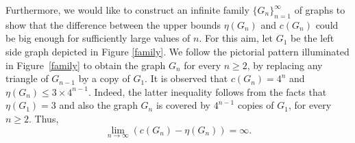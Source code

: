 \documentclass[12pt]{amsart}
\let\to=\rightarrow
\begin{document}
\par Furthermore, we would like to construct an infinite family $\{G_n\}_{n=1}^{\infty}$ of graphs to show that the difference between the upper bounds $\eta(G_n)$ and $c(G_n)$ could be big enough for sufficiently large values of $n$. For this aim, let $G_1$ be the left side graph depicted in Figure \ref{family}. We follow the pictorial pattern illuminated in Figure~\ref{family} to obtain the graph $G_n$ for every $n\geq 2$, by replacing any triangle of $G_{n-1}$ by a copy of $G_1$. It is observed that $c(G_n)=4^n$ and $\eta(G_n)\leq 3\times 4^{n-1}$. Indeed, the latter inequality follows from the facts that $\eta(G_1)=3$ and also the graph $G_n$ is covered by $4^{n-1}$ copies of $G_1$, for every $n\geq 2$. Thus, $$\lim_{n \to \infty}(c(G_n)-\eta(G_n))=\infty.$$  
\end{document}
